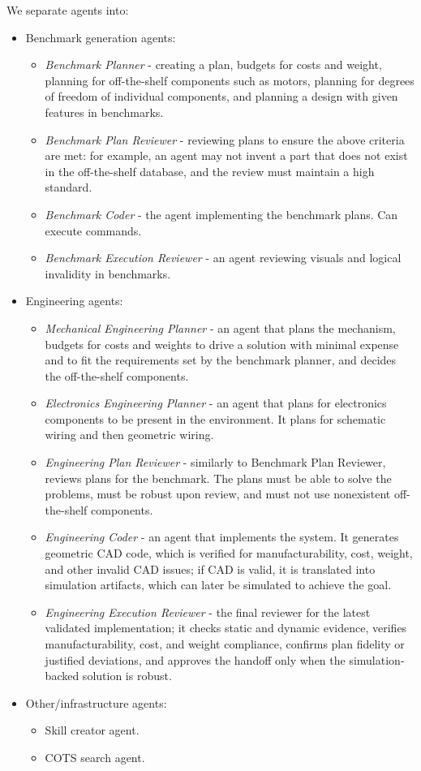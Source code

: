 \documentclass[conference]{IEEEtran}
\begin{document}
We separate agents into:
\begin{itemize}
    \item Benchmark generation agents:
    \begin{itemize}
        \item \emph{Benchmark Planner} - creating a plan, budgets for costs and weight, planning for off-the-shelf components such as motors, planning for degrees of freedom of individual components, and planning a design with given features in benchmarks.
        \item \emph{Benchmark Plan Reviewer} - reviewing plans to ensure the above criteria are met: for example, an agent may not invent a part that does not exist in the off-the-shelf database, and the review must maintain a high standard.
        \item \emph{Benchmark Coder} - the agent implementing the benchmark plans. Can execute commands.
        \item \emph{Benchmark Execution Reviewer} - an agent reviewing visuals and logical invalidity in benchmarks.
    \end{itemize}
    \item Engineering agents:
    \begin{itemize}
        \item \emph{Mechanical Engineering Planner} - an agent that plans the mechanism, budgets for costs and weights to drive a solution with minimal expense and to fit the requirements set by the benchmark planner, and decides the off-the-shelf components.
        \item \emph{Electronics Engineering Planner} - an agent that plans for electronics components to be present in the environment. It plans for schematic wiring and then geometric wiring.
        \item \emph{Engineering Plan Reviewer} - similarly to Benchmark Plan Reviewer, reviews plans for the benchmark. The plans must be able to solve the problems, must be robust upon review, and must not use nonexistent off-the-shelf components.
        \item \emph{Engineering Coder} - an agent that implements the system. It generates geometric CAD code, which is verified for manufacturability, cost, weight, and other invalid CAD issues; if CAD is valid, it is translated into simulation artifacts, which can later be simulated to achieve the goal.
        \item \emph{Engineering Execution Reviewer} - the final reviewer for the latest validated implementation; it checks static and dynamic evidence, verifies manufacturability, cost, and weight compliance, confirms plan fidelity or justified deviations, and approves the handoff only when the simulation-backed solution is robust.
    \end{itemize}
    \item Other/infrastructure agents:
    \begin{itemize}
        \item Skill creator agent.
        \item COTS search agent.
    \end{itemize}
\end{itemize}
\end{document}
